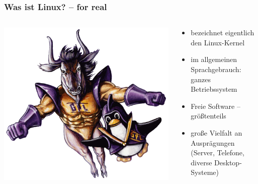 \documentclass[t]{beamer}
\begin{document}
\begin{frame}
  \frametitle{Was ist Linux? – for real}
  \begin{columns}
    \begin{column}[T]{0.45\textwidth}
      \includegraphics[width=\textwidth]{img-src/linux-gnu.png}
    \end{column}
    \begin{column}{0.45\textwidth}
      \begin{itemize}
      \item bezeichnet eigentlich den Linux-Kernel
      \item im allgemeinen Sprachgebrauch: ganzes Betriebssystem
      \item Freie Software – größtenteils
      \item große Vielfalt an Ausprägungen (Server, Telefone, diverse
        Desktop-Systeme)
      \end{itemize}
    \end{column}
  \end{columns}
\end{frame}
\end{document}
